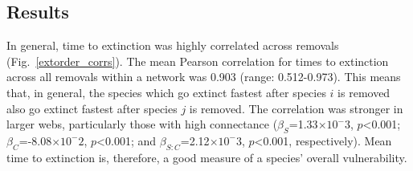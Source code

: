 \documentclass[12pt]{article}
\begin{document}
\begin{spacing}{2.0}
	\subsection*{Results}

		In general, time to extinction was highly correlated across removals (Fig.~\ref{extorder_corrs}). %
		The mean Pearson correlation for times to extinction across all removals within a network was 0.903 (range: 0.512-0.973). %
		This means that, in general, the species which go extinct fastest after species $i$ is removed also go extinct fastest after species $j$ is removed.
		The correlation was stronger in larger webs, particularly those with high connectance ($\beta_{S}$=1.33$\times10^-3$, $p$\textless0.001; $\beta_{C}$=-8.08$\times10^-2$, $p$\textless0.001; and $\beta_{S:C}$=2.12$\times10^-3$, $p$\textless0.001, respectively). 
		Mean time to extinction is, therefore, a good measure of a species' overall vulnerability.



\end{spacing}
\end{document}
